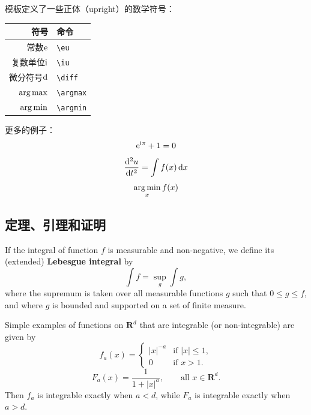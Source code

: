模板定义了一些正体（upright）的数学符号：
\begin{center}
  \begin{tabular}{rl}
    \toprule
    符号                 & 命令 \\
    \midrule
    常数$\mathrm{e}$     & \verb|\eu| \\
    复数单位$\mathrm{i}$ & \verb|\iu| \\
    微分符号$\mathop{}\!\mathrm{d}$ & \verb|\diff| \\
    $\operatorname*{arg\,max}$         & \verb|\argmax| \\
    $\operatorname*{arg\,min}$         & \verb|\argmin| \\
    \bottomrule
  \end{tabular}
\end{center}

更多的例子：
\begin{equation}
\mathrm{e}^{\mathrm{i}\pi} + 1 = 0
\end{equation}
\begin{equation}
\frac{\mathop{}\!\mathrm{d}^2u}{\mathop{}\!\mathrm{d} t^2} = \int f(x) \mathop{}\!\mathrm{d} x
\end{equation}
\begin{equation}
\operatorname*{arg\,min}_x f(x)
\end{equation}

\subsection{定理、引理和证明}

\begin{definition}
  If the integral of function $f$ is measurable and non-negative, we define
  its (extended) \textbf{Lebesgue integral} by
  \begin{equation}
  \int f = \sup_g \int g,
  \end{equation}
  where the supremum is taken over all measurable functions $g$ such that
  $0 \leq g \leq f$, and where $g$ is bounded and supported on a set of
  finite measure.
\end{definition}

\begin{example}
  Simple examples of functions on $\mathbf{R}^d$ that are integrable
  (or non-integrable) are given by
  \begin{equation}
  f_a(x) =
  \begin{cases}
  |x|^{-a} & \text{if } |x| \leq 1,\\
  0 & \text{if } x > 1.
  \end{cases}
  \end{equation}
  \begin{equation}
  F_a(x) = \frac{1}{1 + |x|^a}, \qquad \text{all } x \in \mathbf{R}^d.
  \end{equation}
  Then $f_a$ is integrable exactly when $a < d$, while $F_a$ is integrable
  exactly when $a > d$.
\end{example}

